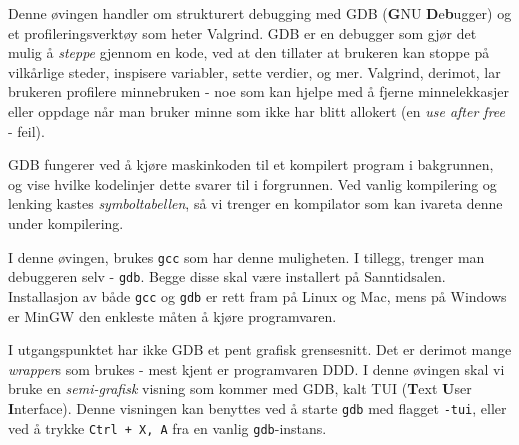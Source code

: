 \begin{alphasection}
Denne øvingen handler om strukturert debugging med GDB (\textbf{G}NU \textbf{D}e\textbf{b}ugger) og et profileringsverktøy som heter Valgrind. GDB er en debugger som gjør det mulig å \textit{steppe} gjennom en kode, ved at den tillater at brukeren kan stoppe på vilkårlige steder, inspisere variabler, sette verdier, og mer. Valgrind, derimot, lar brukeren profilere minnebruken - noe som kan hjelpe med å fjerne minnelekkasjer eller oppdage når man bruker minne som ikke har blitt allokert (en \textit{use after free} - feil).


GDB fungerer ved å kjøre maskinkoden til et kompilert program i bakgrunnen, og vise hvilke kodelinjer dette svarer til i forgrunnen. Ved vanlig kompilering og lenking kastes \textit{symboltabellen}, så vi trenger en kompilator som kan ivareta denne under kompilering.

I denne øvingen, brukes \verb|gcc| som har denne muligheten. I tillegg, trenger man debuggeren selv - \verb|gdb|. Begge disse skal være installert på Sanntidsalen. Installasjon av både \verb|gcc| og \verb|gdb| er rett fram på Linux og Mac, mens på Windows er MinGW den enkleste måten å kjøre programvaren.

I utgangspunktet har ikke GDB et pent grafisk grensesnitt. Det er derimot mange \textit{wrapper}s som brukes - mest kjent er programvaren DDD. I denne øvingen skal vi bruke en \textit{semi-grafisk} visning som kommer med GDB, kalt TUI (\textbf{T}ext \textbf{U}ser \textbf{I}nterface). Denne visningen kan benyttes ved å starte \verb|gdb| med flagget \verb|-tui|, eller ved å trykke \verb|Ctrl + X, A| fra en vanlig \verb|gdb|-instans.

\end{alphasection}

\setcounter{section}{0}